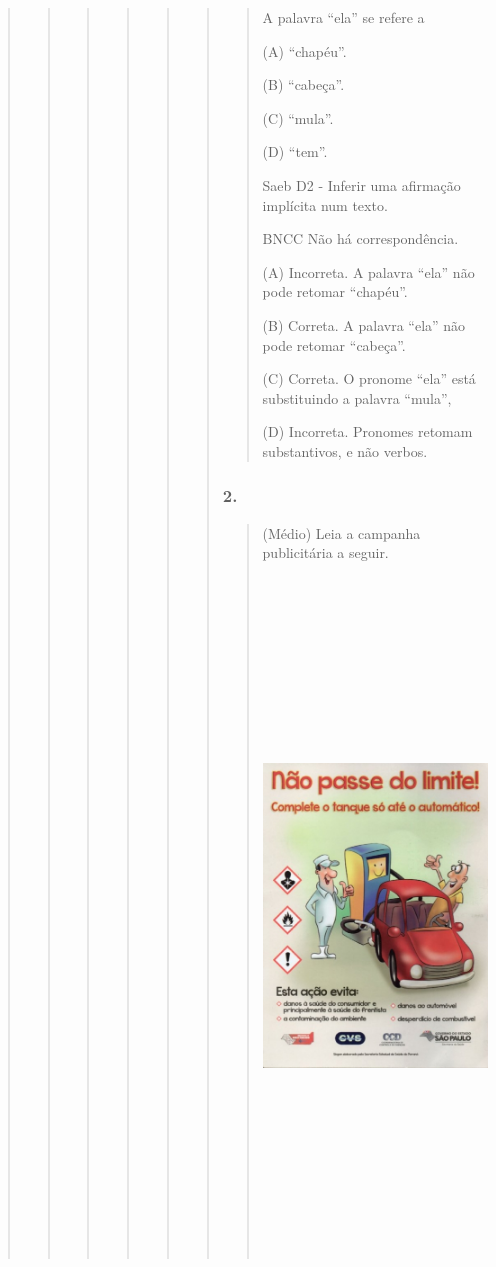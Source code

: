 \begin{quote}
\begin{quote}
\begin{quote}
\begin{quote}
\begin{quote}
\begin{quote}
\begin{quote}
A palavra ``ela'' se refere a

(A) ``chapéu''.

(B) ``cabeça''.

(C) ``mula''.

(D) ``tem''.

Saeb D2 - Inferir uma afirmação implícita num texto.

BNCC Não há correspondência.

(A) Incorreta. A palavra ``ela'' não pode retomar ``chapéu''.

(B) Correta. A palavra ``ela'' não pode retomar ``cabeça''.

(C) Correta. O pronome ``ela'' está substituindo a palavra ``mula'',

(D) Incorreta. Pronomes retomam substantivos, e não verbos.
\end{quote}

\subsubsection{2. }\label{section-78}

\begin{quote}
(Médio) Leia a campanha publicitária a seguir.

\includegraphics[width=5.20833in,height=7.05556in]{media/image35.jpeg}


\end{quote}
\end{quote}
\end{quote}
\end{quote}
\end{quote}
\end{quote}
\end{quote}
